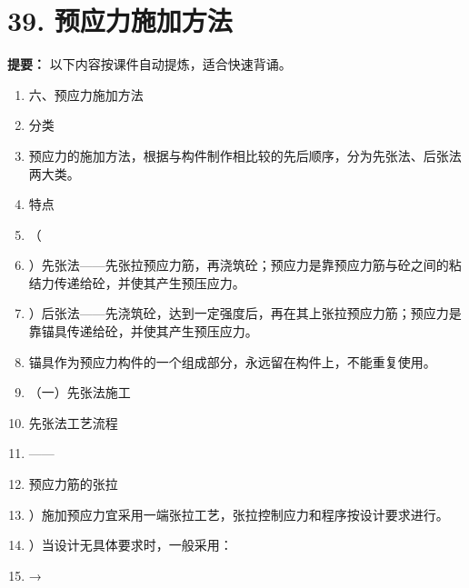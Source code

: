 \documentclass[UTF8,fontset=fandol,11pt]{ctexart}
\begin{document}
\newpage

\section*{39. 预应力施加方法}


\begin{mainbox}

\textbf{提要：} 以下内容按课件自动提炼，适合快速背诵。

\end{mainbox}

\begin{enumerate}[label=\arabic*.]

\item 六、预应力施加方法

\item 分类

\item 预应力的施加方法，根据与构件制作相比较的先后顺序，分为先张法、后张法两大类。

\item 特点

\item （

\item ）先张法——先张拉预应力筋，再浇筑砼；预应力是靠预应力筋与砼之间的粘结力传递给砼，并使其产生预压应力。

\item ）后张法——先浇筑砼，达到一定强度后，再在其上张拉预应力筋；预应力是靠锚具传递给砼，并使其产生预压应力。

\item 锚具作为预应力构件的一个组成部分，永远留在构件上，不能重复使用。

\item （一）先张法施工

\item 先张法工艺流程

\item ——

\item 预应力筋的张拉

\item ）施加预应力宜采用一端张拉工艺，张拉控制应力和程序按设计要求进行。

\item ）当设计无具体要求时，一般采用：

\item →


\end{enumerate}
\end{document}
